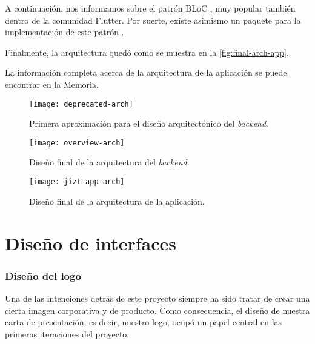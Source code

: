 A continuación, nos informamos sobre el patrón BLoC \cite{bloc-pattern}, muy popular también dentro de la comunidad Flutter. Por suerte, existe asimismo un paquete para la implementación de este patrón \cite{bloc-package}.

Finalmente, la arquitectura quedó como se muestra en la \autoref{fig:final-arch-app}.

La información completa acerca de la arquitectura de la aplicación se puede encontrar en la Memoria.

\newpage

\begin{figure}[h]
	\centering
	\texttt{[image: deprecated-arch]}
	\vspace{-0.5cm}
	\caption[Primera aproximación para la arquitectura del \emph{backend}]{Primera aproximación para el diseño arquitectónico del \emph{backend}.}
	\label{fig:deprecated-arch}
\end{figure}

\newpage

\begin{figure}[H]
	\centering
	\texttt{[image: overview-arch]}
	\vspace{-0.5cm}
	\caption{Diseño final de la arquitectura del \emph{backend}.}
	\label{fig:final-arch-backend}
\end{figure}

\begin{figure}[H]
	\centering
	\texttt{[image: jizt-app-arch]}
	\vspace{-0.5cm}
	\caption{Diseño final de la arquitectura de la aplicación.}
	\label{fig:final-arch-app}
\end{figure}

\newpage

\section{Diseño de interfaces}

\subsubsection{Diseño del logo}

Una de las intenciones detrás de este proyecto siempre ha sido tratar de crear una cierta imagen corporativa y de producto. Como consecuencia, el diseño de nuestra carta de presentación, es decir, nuestro logo, ocupó un papel central en las primeras iteraciones del proyecto.

